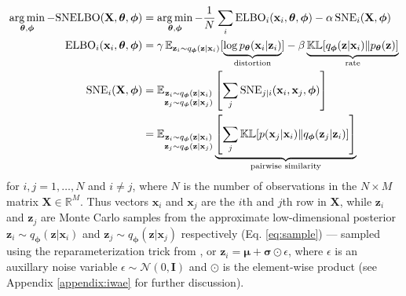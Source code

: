 \begin{subequations}
\begin{align}
    \operatorname*{arg\,min}_{\boldsymbol{\theta}, \boldsymbol{\phi}} -\mathrm{SNELBO}(\mathbf{X}, \boldsymbol{\theta}, \boldsymbol{\phi}) &= \operatorname*{arg\,min}_{\boldsymbol{\theta}, \boldsymbol{\phi}}
    -\frac{1}{N}\sum_{i} \mathrm{ELBO}_i(\mathbf{x}_i, \boldsymbol{\theta}, \boldsymbol{\phi}) - \alpha\, \mathrm{SNE}_i(\mathbf{X}, \boldsymbol{\phi}) \label{eq:vaesne_obj}
    \\
    \mathrm{ELBO}_i(\mathbf{x}_i, \boldsymbol{\theta}, \boldsymbol{\phi}) &= \gamma \, \mathbb{E}_{\mathbf{z}_i \sim q_{\boldsymbol{\phi}}(\mathbf{z} | \mathbf{x}_i)}[\underbrace{\log p_{\boldsymbol{\theta}}(\mathbf{x}_i | \mathbf{z}_i) }_{\textrm{distortion}}] 
    - \beta \underbrace{\mathbb{KL}[q_{\boldsymbol{\phi}}(\mathbf{z} | \mathbf{x}_i) \| p_{\boldsymbol{\theta}}(\mathbf{z})]}_{\textrm{rate}} \label{eq:elbo}\\
    \mathrm{SNE}_i(\mathbf{X}, \boldsymbol{\phi}) &= \mathbb{E}_{\substack{\mathbf{z}_i \sim q_{\boldsymbol{\phi}}(\mathbf{z} | 
    \mathbf{x}_i) \\ \mathbf{z}_j \sim q_{\boldsymbol{\phi}}(\mathbf{z} | 
    \mathbf{x}_j)}}\left[\sum_{j}\mathrm{SNE}_{j | i}(\mathbf{x}_i, \mathbf{x}_j, \boldsymbol{\phi})\right] \\ &= \mathbb{E}_{\substack{\mathbf{z}_i \sim q_{\boldsymbol{\phi}}(\mathbf{z} | 
    \mathbf{x}_i) \\ \mathbf{z}_j \sim q_{\boldsymbol{\phi}}(\mathbf{z} | 
    \mathbf{x}_j)}}  \underbrace{\left[\sum_{j} \mathbb{KL}[p(\mathbf{x}_j | \mathbf{x}_i) \| q_{\boldsymbol{\phi}}(\mathbf{z}_j | \mathbf{z}_i)]\right]}_{\textrm{pairwise similarity}} \label{eq:pw_sim}
\end{align}
\end{subequations}
for $i, j = 1,\dots,N$ and $i \neq j$, where $N$ is the number of observations in the $N \times M$ matrix $\mathbf{X} \in \mathbb{R}^{M}$. Thus vectors $\mathbf{x}_i$ and $\mathbf{x}_j$ are the $i$th and $j$th row in $\mathbf{X}$, while $\mathbf{z}_i$ and $\mathbf{z}_j$ are Monte Carlo samples from the approximate low-dimensional posterior $\mathbf{z}_i \sim q_{\boldsymbol{\phi}}(\mathbf{z} | \mathbf{x}_i)$ and $\mathbf{z}_j \sim q_{\boldsymbol{\phi}}(\mathbf{z} | \mathbf{x}_j)$ respectively (Eq. \ref{eq:sample}) --- sampled using the reparameterization trick from \cite{kingma2013vae}, or $\mathbf{z}_i = \boldsymbol{\mu} + \boldsymbol{\sigma} \odot \epsilon$, where $\epsilon$ is an auxillary noise variable $\epsilon \sim \mathcal{N}(0, \mathbf{I})$ and $\odot$ is the element-wise product (see Appendix \ref{appendix:iwae}
for further discussion). 

